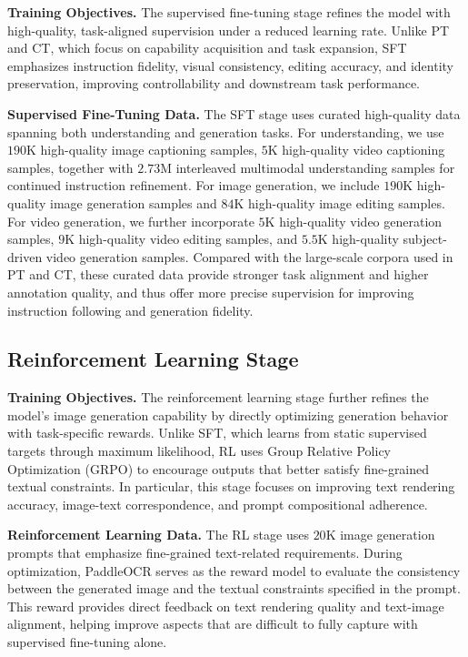 \textbf{Training Objectives.}
The supervised fine-tuning stage refines the model with high-quality, task-aligned supervision under a reduced learning rate. Unlike PT and CT, which focus on capability acquisition and task expansion, SFT emphasizes instruction fidelity, visual consistency, editing accuracy, and identity preservation, improving controllability and downstream task performance.




\textbf{Supervised Fine-Tuning Data.}
The SFT stage uses curated high-quality data spanning both understanding and generation tasks. For understanding, we use $190$K high-quality image captioning samples, $5$K high-quality video captioning samples, together with $2.73$M interleaved multimodal understanding samples for continued instruction refinement. For image generation, we include $190$K high-quality image generation samples and $84$K high-quality image editing samples. For video generation, we further incorporate $5$K high-quality video generation samples, $9$K high-quality video editing samples, and $5.5$K high-quality subject-driven video generation samples. Compared with the large-scale corpora used in PT and CT, these curated data provide stronger task alignment and higher annotation quality, and thus offer more precise supervision for improving instruction following and generation fidelity.




\subsection{Reinforcement Learning Stage}

\textbf{Training Objectives.}
The reinforcement learning stage further refines the model's image generation capability by directly optimizing generation behavior with task-specific rewards. Unlike SFT, which learns from static supervised targets through maximum likelihood, RL uses Group Relative Policy Optimization (GRPO) to encourage outputs that better satisfy fine-grained textual constraints. In particular, this stage focuses on improving text rendering accuracy, image-text correspondence, and prompt compositional adherence.

\textbf{Reinforcement Learning Data.}
The RL stage uses $20$K image generation prompts that emphasize fine-grained text-related requirements. During optimization, PaddleOCR \cite{cui2025paddleocr} serves as the reward model to evaluate the consistency between the generated image and the textual constraints specified in the prompt. This reward provides direct feedback on text rendering quality and text-image alignment, helping improve aspects that are difficult to fully capture with supervised fine-tuning alone.

